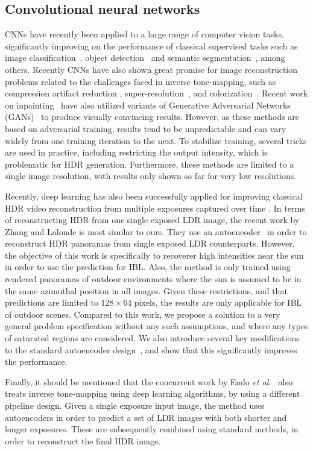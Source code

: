 \documentclass[acmtog]{acmart}
\newcommand{\etal}{\emph{et al.\ }}
\newcommand\customsection[1]{\subsection{#1}}
\begin{document}
\customsection{Convolutional neural networks} 
CNNs have recently been applied to a large range of computer vision tasks, significantly improving on the performance of classical supervised tasks such as image classification~\cite{Simonyan2014}, object detection~\cite{ren2015faster} and semantic segmentation~\cite{Long2015}, among others. Recently CNNs have also shown great promise for image reconstruction problems related to the challenges faced in inverse tone-mapping, such as compression artifact reduction \cite{Svoboda2016}, super-resolution~\cite{Ledig2016}, and colorization~\cite{Iizuka2016}.
Recent work on inpainting~\cite{Pathak2016,yang2016high} have also utilized variants of Generative Adversarial Networks (GANs)~\cite{Goodfellow2014} to produce visually convincing results. However, as these methods are based on adversarial training, results tend to be unpredictable and can vary widely from one training iteration to the next. To stabilize training, several tricks are used in practice, including restricting the output intensity, which is problematic for HDR generation. Furthermore, these methods are limited to a single image resolution, with results only shown so far for very low resolutions.

Recently, deep learning has also been successfully applied for improving classical HDR video reconstruction from multiple exposures captured over time \cite{Kalantari2017}. 
In terms of reconstructing HDR from one single exposed LDR image, the recent work by Zhang and Lalonde \citeyear{Zhang2017} is most similar to ours. They use an autoencoder~\cite{hinton2006reducing} in order to reconstruct HDR panoramas from single exposed LDR counterparts. 
However, the objective of this work is specifically to recoverer high intensities near the sun in order to use the prediction for IBL. Also, the method is only trained using rendered panoramas of outdoor environments where the sun is assumed to be in the same azimuthal position in all images.
Given these restrictions, and that predictions are limited to $128 \times 64$ pixels, the results are only applicable for IBL of outdoor scenes. Compared to this work, we propose a solution to a very general problem specification without any such assumptions, and where any types of saturated regions are considered. We also introduce several key modifications to the standard autoencoder design~\cite{hinton2006reducing}, and show that this significantly improves the performance.

Finally, it should be mentioned that the concurrent work by Endo \etal \citeyear{Endo2017} also treats inverse tone-mapping using deep learning algorithms, by using a different pipeline design. Given a single exposure input image, the method uses autoencoders in order to predict a set of LDR images with both shorter and longer exposures. These are subsequently combined using standard methods, in order to reconstruct the final HDR image. 
\end{document}
